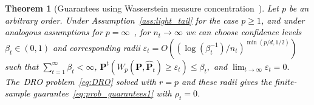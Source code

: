 \documentclass[12pt]{article}
\newcommand{\ie}{{\it i.e.}}
\newcommand{\prob}{{\mathbf P}}
\newcommand{\Expect}{{\mbox{\bf E}}}
\newcommand{\epsnom}{\varepsilon}
\newcommand{\barp}{p}
\newtheorem{theorem}{Theorem}[section]  %
\newcommand{\RC}[1]{\textcolor{black}{#1}}
\newcommand{\RC}[1]{\textcolor{blue}{#1}}
\begin{document}
\begin{theorem}[Guarantees using Wasserstein measure concentration~\cite{fournier2015rate,kuhn2019wasserstein}]
    \label{thm:calc_eps}
    \RC{Let $\barp$ be an arbitrary order. 
    Under Assumption~\ref{ass:light_tail} for the case $\barp \geq 1$, and under analogous assumptions for $\barp =\infty$~\cite{wass-p-guarantee}, for $n_t \rightarrow \infty$ we can choose confidence levels $\beta_t \in (0,1)$ and corresponding radii $\epsnom_t=O((\log(\beta^{-1}_t)/{n_t})^{\min(\barp/d,1/2)})$ such that $\sum_{t=1}^\infty \beta_t < \infty$,
    $\prob^{t}(W_{\barp}(\prob,\hat{\prob}_t) \geq \epsnom_t) \leq \beta_t,$ and $\lim_{t \rightarrow \infty} \epsnom_t = 0.$ The~\gls{DRO} problem~\eqref{eq:DRO} solved with $r = \barp$ and these radii gives the finite-sample guarantee~\eqref{eq:prob_guarantees1} with $\rho_{t} = 0$.}
\end{theorem}
\end{document}
